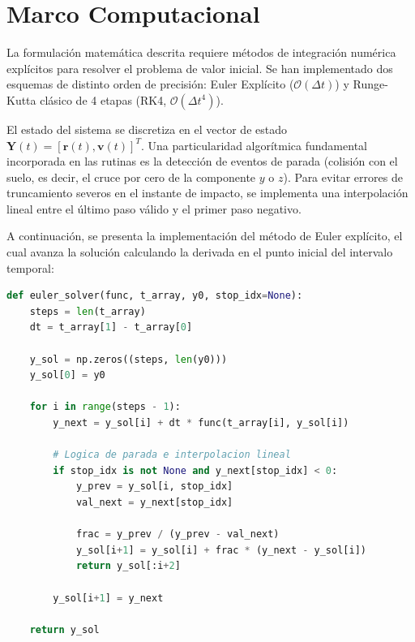 \section{Marco Computacional}

La formulación matemática descrita requiere métodos de integración numérica explícitos para resolver el problema de valor inicial. Se han implementado dos esquemas de distinto orden de precisión: Euler Explícito ($\mathcal{O}(\Delta t)$) y Runge-Kutta clásico de 4 etapas (RK4, $\mathcal{O}(\Delta t^4)$).

El estado del sistema se discretiza en el vector de estado $\mathbf{Y}(t) = [\mathbf{r}(t), \mathbf{v}(t)]^T$. Una particularidad algorítmica fundamental incorporada en las rutinas es la detección de eventos de parada (colisión con el suelo, es decir, el cruce por cero de la componente $y$ o $z$). Para evitar errores de truncamiento severos en el instante de impacto, se implementa una interpolación lineal entre el último paso válido y el primer paso negativo.

A continuación, se presenta la implementación del método de Euler explícito, el cual avanza la solución calculando la derivada en el punto inicial del intervalo temporal:

\begin{lstlisting}[language=Python, caption={Implementación del método de Euler explícito con interpolación de impacto.}]
def euler_solver(func, t_array, y0, stop_idx=None):
    steps = len(t_array)
    dt = t_array[1] - t_array[0]
    
    y_sol = np.zeros((steps, len(y0)))
    y_sol[0] = y0
    
    for i in range(steps - 1):
        y_next = y_sol[i] + dt * func(t_array[i], y_sol[i])
        
        # Logica de parada e interpolacion lineal
        if stop_idx is not None and y_next[stop_idx] < 0:
            y_prev = y_sol[i, stop_idx]
            val_next = y_next[stop_idx]
            
            frac = y_prev / (y_prev - val_next)
            y_sol[i+1] = y_sol[i] + frac * (y_next - y_sol[i])
            return y_sol[:i+2]

        y_sol[i+1] = y_next
        
    return y_sol
\end{lstlisting}


